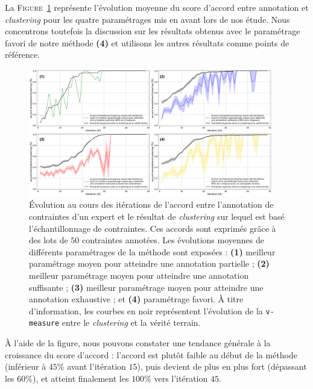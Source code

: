 			La \textsc{Figure~\ref{figure:4.5.1-ETUDE-RENTABILITE-ACCORD-ANNOTATION-CLUSTERING}} représente l'évolution moyenne du score d'accord entre annotation et \textit{clustering} pour les quatre paramétrages mis en avant lors de nos étude.
			Nous concentrons toutefois la discussion sur les résultats obtenus avec le paramétrage favori de notre méthode \textbf{(4)} et utilisons les autres résultats comme points de référence.
			\begin{figure}[!htb]
				\centering
				\includegraphics[width=0.95\textwidth]{figures/etude-rentabilite-accord-annotation}
				\caption{Évolution au cours des itérations de l'accord entre l'annotation de contraintes d'un expert et le résultat de \textit{clustering} sur lequel est basé l'échantillonnage de contraintes.
				Ces accords sont exprimés grâce à des lots de $50$ contraintes annotées.
				Les évolutions moyennes de différents paramétrages de la méthode sont exposées :
				\textbf{(1)} meilleur paramétrage moyen pour atteindre une annotation partielle ;
				\textbf{(2)} meilleur paramétrage moyen pour atteindre une annotation suffisante ;
				\textbf{(3)} meilleur paramétrage moyen pour atteindre une annotation exhaustive ;
				et \textbf{(4)} paramétrage favori.
				À titre d'information, les courbes en noir représentent l'évolution de la \texttt{v-measure} entre le \textit{clustering} et la vérité terrain.
				} 
				\label{figure:4.5.1-ETUDE-RENTABILITE-ACCORD-ANNOTATION-CLUSTERING}
			\end{figure}
			
			À l'aide de la figure, nous pouvons constater une tendance générale à la croissance du score d'accord : l'accord est plutôt faible au début de la méthode (inférieur à $45$\% avant l'itération $15$), puis devient de plus en plus fort (dépassant les $60$\%), et atteint finalement les $100$\% vers l'itération $45$.
			
